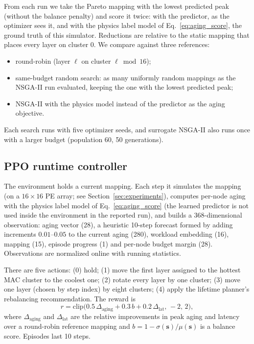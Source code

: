 \documentclass[conference]{IEEEtran}
\begin{document}
From each run we take the Pareto mapping with the lowest predicted peak (without the balance penalty) and score it twice: with the predictor, as the optimizer sees it, and with the physics label model of Eq.~\eqref{eq:aging_score}, the ground truth of this simulator. Reductions are relative to the static mapping that places every layer on cluster 0. We compare against three references:
\begin{itemize}
    \item round-robin (layer $\ell$ on cluster $\ell \bmod 16$);
    \item same-budget random search: as many uniformly random mappings as the NSGA-II run evaluated, keeping the one with the lowest predicted peak;
    \item NSGA-II with the physics model instead of the predictor as the aging objective.
\end{itemize}
Each search runs with five optimizer seeds, and surrogate NSGA-II also runs once with a larger budget (population 60, 50 generations).

\subsection{PPO runtime controller}
\label{sec:ppo}

The environment holds a current mapping. Each step it simulates the mapping (on a $16\times 16$ PE array; see Section~\ref{sec:experiments}), computes per-node aging with the physics label model of Eq.~\eqref{eq:aging_score} (the learned predictor is not used inside the environment in the reported run), and builds a 368-dimensional observation: aging vector (28), a heuristic 10-step forecast formed by adding increments $0.01$--$0.05$ to the current aging (280), workload embedding (16), mapping (15), episode progress (1) and per-node budget margin (28). Observations are normalized online with running statistics.

There are five actions: (0) hold; (1) move the first layer assigned to the hottest MAC cluster to the coolest one; (2) rotate every layer by one cluster; (3) move one layer (chosen by step index) by eight clusters; (4) apply the lifetime planner's rebalancing recommendation. The reward is
\begin{equation}
    r = \text{clip}\big(0.5\,\Delta_{\text{aging}} + 0.3\,b + 0.2\,\Delta_{\text{lat}},\, -2,\, 2\big),
    \label{eq:reward}
\end{equation}
where $\Delta_{\text{aging}}$ and $\Delta_{\text{lat}}$ are the relative improvements in peak aging and latency over a round-robin reference mapping and $b = 1 - \sigma(\mathbf{s})/\mu(\mathbf{s})$ is a balance score. Episodes last 10 steps.
\end{document}

